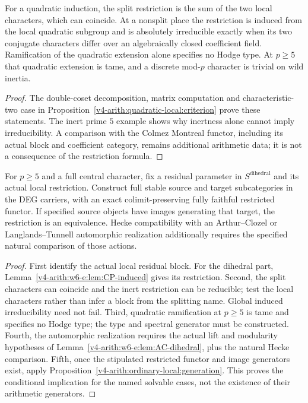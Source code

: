 \begin{lemma}
\label{v4-arith:w6-e:lem:CP-induced}
For a quadratic induction, the split restriction is the sum of the two
local characters, which can coincide. At a nonsplit place the restriction
is induced from the local quadratic subgroup and is absolutely
irreducible exactly when its two conjugate characters differ over an
algebraically closed coefficient field. Ramification of the quadratic
extension alone specifies no Hodge type. At $p\ge5$ that quadratic
extension is tame, and a discrete mod-$p$ character is trivial on wild inertia.
\end{lemma}
\begin{proof}
The double-coset decomposition, matrix computation and characteristic-two
case in Proposition~\ref{v4-arith:quadratic-local:criterion} prove these
statements. The inert prime $5$ example shows why inertness alone cannot
imply irreducibility. A comparison with the Colmez Montreal functor,
including its actual block and coefficient category, remains additional
arithmetic data; it is not a consequence of the restriction formula.
\end{proof}

\begin{theorem}
\label{v4-arith:w6-e:thm:TW-removal-dihedral}
For $p\ge5$ and a full central character, fix a residual parameter in
$S^{\mathrm{dihedral}}$ and its actual local restriction. Construct
full stable source and target subcategories in the DEG carriers,
with an exact colimit-preserving fully faithful restricted functor.
If specified source objects have images generating that target,
the restriction is an equivalence. Hecke compatibility with an
Arthur--Clozel or Langlands--Tunnell automorphic realization additionally
requires the specified natural comparison of those actions.
\end{theorem}
\begin{proof}
First identify the actual local residual block. For the dihedral part,
Lemma~\ref{v4-arith:w6-e:lem:CP-induced} gives its restriction.
Second, the split characters can coincide and the inert restriction
can be reducible; test the local characters rather than infer a block
from the splitting name. Global induced irreducibility need not fail.
Third, quadratic ramification at $p\ge5$ is tame and specifies no
Hodge type; the type and spectral generator must be constructed.
Fourth, the automorphic realization requires the actual lift and
modularity hypotheses of Lemma~\ref{v4-arith:w6-e:lem:AC-dihedral},
plus the natural Hecke comparison. Fifth, once the stipulated
restricted functor and image generators exist, apply
Proposition~\ref{v4-arith:ordinary-local:generation}. This proves
the conditional implication for the named solvable cases, not the
existence of their arithmetic generators.
\end{proof}

